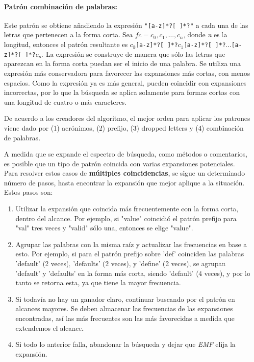 {\paragraph{Patrón combinación de palabras:}
Este patrón se obtiene añadiendo la expresión \verb;"[a-z]*?[ ]*?"; a cada una de las letras que pertenecen a la forma corta.
Sea $fc = c_0, c_1, \dots, c_n$, donde \textit{n} es la longitud, entonces el patrón resultante es $c_0$\verb;[a-z]*?[ ]*?;$c_1$\verb;[a-z]*?[ ]*?;$\dots$\verb;[a-z]*?[ ]*?;$c_n$.
La expresión se construye de manera que sólo las letras que aparezcan en la forma corta puedan ser el inicio de una palabra.
Se utiliza una expresión más conservadora para favorecer las expansiones más cortas, con menos espacios.
Como la expresión ya es más general, pueden coincidir con expansiones incorrectas, por lo que la búsqueda se aplica solamente para formas cortas con una longitud de cuatro o más caracteres.

De acuerdo a los creadores del algoritmo, el mejor orden para aplicar los patrones viene dado por (1) acrónimos, (2) prefijo, (3) dropped letters y (4) combinación de palabras.

A medida que se expande el espectro de búsqueda, como métodos o comentarios, es posible que un tipo de patrón coincida con varias expansiones potenciales.
Para resolver estos casos de \textbf{múltiples coincidencias}, se sigue un determinado número de pasos, hasta encontrar la expansión que mejor aplique a la situación.
Estos pasos son:
\begin{enumerate}
  \item Utilizar la expansión que coincida más frecuentemente con la forma corta, dentro del alcance.
  Por ejemplo, si "value" coincidió el patrón prefijo para "val" tres veces y "valid" sólo una, entonces se elige "value".
  \item Agrupar las palabras con la misma raíz y actualizar las frecuencias en base a esto.
  Por ejemplo, si para el patrón prefijo sobre 'def' coinciden las palabras 'default' (2 veces), 'defaults' (2 veces), y 'define' (2 veces), se agrupan 'default' y 'defaults' en la forma más corta, siendo 'default' (4 veces), y por lo tanto se retorna esta, ya que tiene la mayor frecuencia.
  \item Si todavía no hay un ganador claro, continuar buscando por el patrón en alcances mayores.
  Se deben almacenar las frecuencias de las expansiones encontradas, así las más frecuentes son las más favorecidas a medida que extendemos el alcance.
  \item Si todo lo anterior falla, abandonar la búsqueda y dejar que \textit{EMF} elija la expansión.
\end{enumerate}

}

